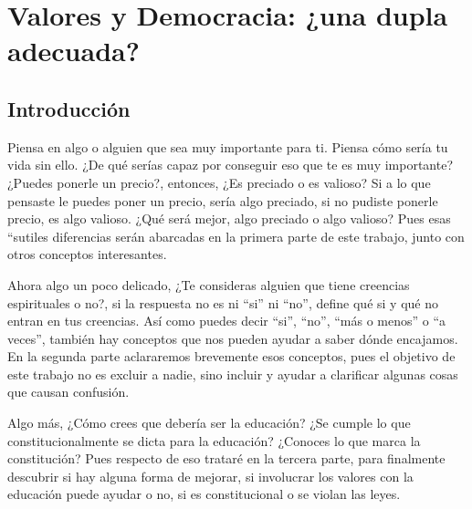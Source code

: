 \chapter{Valores y Democracia: ¿una dupla adecuada?}
\section{Introducción}
Piensa en algo o alguien que sea muy importante para ti. Piensa cómo sería tu vida sin ello. ¿De qué serías capaz por conseguir eso que te es muy importante? ¿Puedes ponerle un precio?, entonces, ¿Es preciado o es valioso? Si a lo que pensaste le puedes poner un precio, sería algo preciado, si no pudiste ponerle precio, es algo valioso. ¿Qué será mejor, algo preciado o algo valioso? Pues esas “sutiles diferencias serán abarcadas en la primera parte de este trabajo, junto con otros conceptos interesantes.

Ahora algo un poco delicado, ¿Te consideras alguien que tiene creencias espirituales o no?, si la respuesta no es ni “si” ni “no”, define qué si y qué no entran en tus creencias. Así como puedes decir “si”, “no”, “más o menos” o “a veces”, también hay conceptos que nos pueden ayudar a saber dónde encajamos. En la segunda parte aclararemos brevemente esos conceptos, pues el objetivo de este trabajo no es excluir a nadie, sino incluir y ayudar a clarificar algunas cosas que causan confusión.

Algo más, ¿Cómo crees que debería ser la educación? ¿Se cumple lo que constitucionalmente se dicta para la educación? ¿Conoces lo que marca la constitución? Pues respecto de eso trataré en la tercera parte, para finalmente descubrir si hay alguna forma de mejorar, si involucrar los valores con la educación puede ayudar o no, si es constitucional o se violan las leyes.
